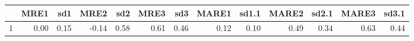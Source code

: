 \begin{table}[ht]
\centering
\begin{tabular}{rrrrrrrrrrrrr}
  \hline
 & MRE1 & sd1 & MRE2 & sd2 & MRE3 & sd3 & MARE1 & sd1.1 & MARE2 & sd2.1 & MARE3 & sd3.1 \\ 
  \hline
1 & 0.00 & 0.15 & -0.14 & 0.58 & 0.61 & 0.46 & 0.12 & 0.10 & 0.49 & 0.34 & 0.63 & 0.44 \\ 
   \hline
\end{tabular}
\end{table}
